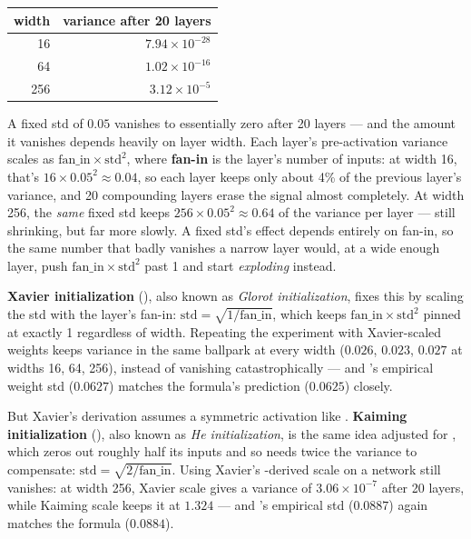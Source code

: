 \begin{center}
\renewcommand{\arraystretch}{1.3}
\begin{tabular}{rr}
\hline
\textbf{width} & \textbf{variance after 20 layers} \\
\hline
16  & $7.94\times10^{-28}$ \\
64  & $1.02\times10^{-16}$ \\
256 & $3.12\times10^{-5}$ \\
\hline
\end{tabular}
\end{center}

A fixed std of $0.05$ vanishes to essentially zero after 20 layers --- and the amount it vanishes depends heavily on layer width. Each layer's pre-activation variance scales as $\text{fan\_in}\times\text{std}^2$, where \textbf{fan-in} is the layer's number of inputs: at width 16, that's $16\times0.05^2\approx0.04$, so each layer keeps only about 4\% of the previous layer's variance, and 20 compounding layers erase the signal almost completely. At width 256, the \emph{same} fixed std keeps $256\times0.05^2\approx0.64$ of the variance per layer --- still shrinking, but far more slowly. A fixed std's effect depends entirely on fan-in, so the same number that badly vanishes a narrow layer would, at a wide enough layer, push $\text{fan\_in}\times\text{std}^2$ past 1 and start \emph{exploding} instead.

\textbf{Xavier initialization} (), also known as \emph{Glorot initialization}, fixes this by scaling the std with the layer's fan-in: $\text{std}=\sqrt{1/\text{fan\_in}}$, which keeps $\text{fan\_in}\times\text{std}^2$ pinned at exactly 1 regardless of width. Repeating the experiment with Xavier-scaled weights keeps variance in the same ballpark at every width ($0.026$, $0.023$, $0.027$ at widths 16, 64, 256), instead of vanishing catastrophically --- and 's empirical weight std ($0.0627$) matches the formula's prediction ($0.0625$) closely.

But Xavier's derivation assumes a symmetric activation like . \textbf{Kaiming initialization} (), also known as \emph{He initialization}, is the same idea adjusted for , which zeros out roughly half its inputs and so needs twice the variance to compensate: $\text{std}=\sqrt{2/\text{fan\_in}}$. Using Xavier's -derived scale on a  network still vanishes: at width 256, Xavier scale gives a variance of $3.06\times10^{-7}$ after 20 layers, while Kaiming scale keeps it at $1.324$ --- and 's empirical std ($0.0887$) again matches the formula ($0.0884$).

